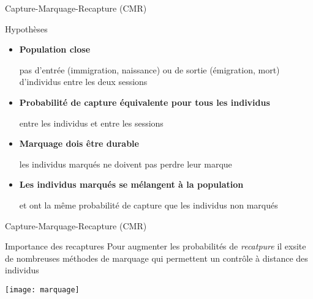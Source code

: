 \documentclass[10pt]{beamer}
\begin{document}
\begin{frame}{Capture-Marquage-Recapture (CMR)}
  \begin{block}{Hypothèses}
    \begin{itemize}[<+->]
    \item \textbf{Population close}\\
      \begin{footnotesize}
        pas d'entrée (immigration, naissance) ou de sortie
        (émigration, mort) d'individus entre les deux sessions 
      \end{footnotesize}
    \item \textbf{Probabilité de capture équivalente pour tous les individus}\\
      \begin{footnotesize}
        entre les individus et entre les sessions
      \end{footnotesize}
    \item \textbf{Marquage dois être durable}\\
      \begin{footnotesize}
        les individus marqués ne doivent pas perdre leur marque
      \end{footnotesize}
    \item \textbf{Les individus marqués se mélangent à la population}\\
      \begin{footnotesize}
        et ont la même probabilité de capture que les individus non marqués
      \end{footnotesize}
    \end{itemize}
  \end{block}
\end{frame}


\begin{frame}{Capture-Marquage-Recapture (CMR)}
  \begin{block}{Importance des recaptures}
    Pour augmenter les probabilités de \emph{recatpure} il exsite de nombreuses
    méthodes de marquage qui permettent un contrôle à distance des
    individus    
  \end{block}
  \begin{center}
    \texttt{[image: marquage]}
  \end{center}
\end{frame}
\end{document}
